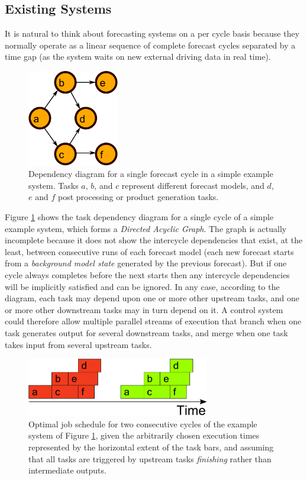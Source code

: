 \documentclass[11pt,a4paper]{article}
\begin{document}
\subsection{Existing Systems}

It is natural to think about forecasting systems on a per cycle basis
because they normally operate as a linear sequence of complete forecast
cycles separated by a time gap (as the system waits on new external
driving data in real time). 
\begin{figure}
    \begin{center}
        \includegraphics[width=4cm]{dependencies-one}
    \end{center}
    \caption{\small Dependency diagram for a single forecast cycle
    in a simple example system. Tasks $a$, $b$, and $c$ represent
    different forecast models, and $d$, $e$ and $f$ post processing or
    product generation tasks.}
    \label{fig-dep-one}
\end{figure}
Figure \ref{fig-dep-one} shows the task dependency diagram for a single
cycle of a simple example system, which forms a {\em Directed
Acyclic Graph}. The graph is actually incomplete because it does not
show the intercycle dependencies that exist, at the least, between
consecutive runs of each forecast model (each new forecast starts from a
{\em background model state} generated by the previous forecast). But
if one cycle always completes before the next starts then any intercycle
dependencies will be implicitly satisfied and can be ignored. In any
case, according to the diagram, each task may depend upon one or more
other upstream tasks, and one or more other downstream tasks may in turn
depend on it. A control system could therefore allow multiple parallel
streams of execution that branch when one task generates output for
several downstream tasks, and merge when one task takes input from
several upstream tasks. 
\begin{figure}
    \begin{center}
        \includegraphics[width=8cm]{timeline-one}
    \end{center}
    \caption{\small Optimal job schedule for two consecutive cycles of
    the example system of Figure \ref{fig-dep-one}, given the
    arbitrarily chosen execution times represented by the horizontal
    extent of the task bars, and assuming that all tasks are triggered
    by upstream tasks {\em finishing} rather than intermediate outputs.} 
    \label{fig-time-one}
\end{figure}
\end{document}
